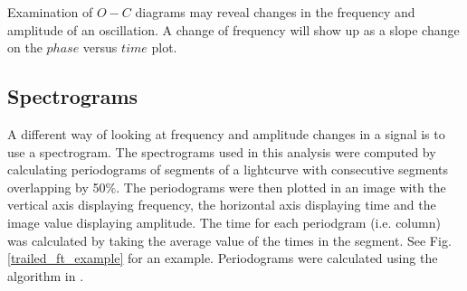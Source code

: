 

Examination of $O-C$ diagrams may reveal changes in the frequency and amplitude of an oscillation. A change of frequency will show up as a slope change on the $phase$ versus $time$ plot.

\subsection{Spectrograms}
\label{spectrogram_section}
A different way of looking at frequency and amplitude changes in a signal is to use a spectrogram. The spectrograms used in this analysis were computed by calculating periodograms of segments of a lightcurve with consecutive segments overlapping by 50\%. The periodograms were then plotted in an image with the vertical axis displaying frequency, the horizontal axis displaying time and the image value displaying amplitude. The time for each periodgram (i.e. column) was calculated by taking the average value of the times in the segment. See Fig. \ref{trailed_ft_example} for an example. Periodograms were calculated using the algorithm in \cite{kurtz_ft}.









